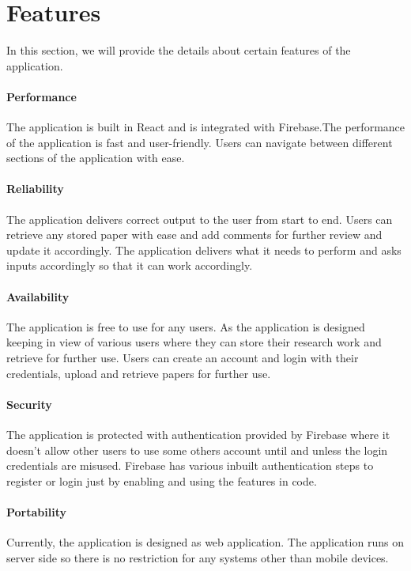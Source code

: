 \section{Features} In this section, we will provide the details about certain features of the application.

\paragraph{\textbf{Performance}} The application is built in React and is integrated with Firebase.The performance of the application is fast and user-friendly. Users can navigate between different sections of the application with ease.

\paragraph{\textbf{Reliability}} The application delivers correct output to the user from start to end. Users can retrieve any stored paper with ease and add comments for further review and update it accordingly. The application delivers what it needs to perform and asks inputs accordingly so that it can work accordingly.

\paragraph{\textbf{Availability}} The application is free to use for any users. As the application is designed keeping in view of various users where they can store their research work and retrieve for further use. Users can create an account and login with their credentials, upload and retrieve papers for further use.

\paragraph{\textbf{Security}} The application is protected with authentication provided by Firebase where it doesn’t allow other users to use some others account until and unless the login credentials are misused. Firebase has various inbuilt authentication steps to register or login just by enabling and using the features in code.

\paragraph{\textbf{Portability}} Currently, the application is designed as web application. The application runs on server side so there is no restriction for any systems other than mobile devices.


